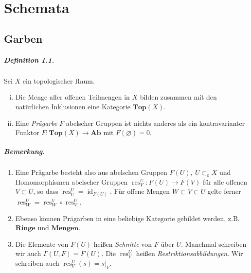 \chapter{Schemata}
\section{Garben}

\paragraph{Definition 1.1.}\label{1.1} Sei $X$ ein topologischer Raum.
\begin{enumerate}[(i)]
\item Die Menge aller offenen Teilmengen in $X$ bilden zusammen mit den natürlichen Inklusionen eine Kategorie $\textbf{Top$(X)$}$.
\item Eine \textit{Prägarbe} $F$ abelscher Gruppen ist nichts anderes als ein kontravarianter Funk\-tor $F:\textbf{Top$(X)$}\to\textbf{Ab}$ mit $F(\varnothing)=0$.
\end{enumerate}

\paragraph{Bemerkung.}\begin{enumerate}
\item Eine Prägarbe besteht also aus abelschen Gruppen $F(U),\ U\subset_\text{o}X$ und Homomorphismen abelscher Gruppen $\operatorname{res}_V^U:F(U)\to F(V)$ für alle offenen $V\subset U$, so dass $\operatorname{res}_U^U=\operatorname{id}_{F(U)}$. Für offene Mengen $W\subset V\subset U$ gelte ferner $\operatorname{res}_W^U=\operatorname{res}_W^V\circ\operatorname{res}_V^U$.
\item Ebenso können Prägarben in eine beliebige Kategorie gebildet werden, z.B. $\textbf{Ringe}$ und $\textbf{Mengen}$.
\item Die Elemente von $F(U)$ heißen \textit{Schnitte} von $F$ über $U$. Manchmal schreiben wir auch $\Gamma(U,F)=F(U)$. Die $\operatorname{res}_V^U$ heißen \textit{Restriktionsabbildungen}. Wir schreiben auch $\operatorname{res}_V^U(s)=s|_V$.
\end{enumerate}

